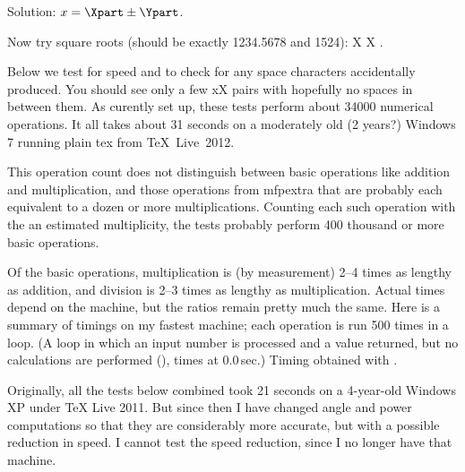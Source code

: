 \indent Solution: $x = \Xpart \pm \I\Ypart$.

Now try square roots (should be exactly 1234.5678 and 1524):
X\startMFPprogram                    %
\Rsqrt\Rpop\X
{}\Rsq\Rsqrt\Rpop\Y
\Export\X
\Export\Y
\stopMFPprogram X \Y.


Below we test for speed and to check for any space characters
accidentally produced. You should see only a few xX pairs with hopefully
no spaces in between them. As curently set up, these tests perform about
34000 numerical operations. It all takes about 31 seconds on a
moderately old (2 years?) Windows 7 running plain tex from
TeX~Live~2012.

This operation count does not distinguish between basic operations like
addition and multiplication, and those operations from mfpextra that are
probably each equivalent to a dozen or more multiplications. Counting
each such operation with the an estimated multiplicity, the tests
probably perform 400 thousand or more basic operations.

Of the basic operations, multiplication is (by measurement) 2--4 times
as lengthy as addition, and division is 2--3 times as lengthy as
multiplication. Actual times depend on the machine, but the ratios
remain pretty much the same. Here is a summary of timings on my fastest
machine; each operation is run 500 times in a loop. (A loop in which
an input number is processed and a value returned, but no calculations are
performed ({\tt\string\MFPzero}), times at $0.0\,$sec.) Timing obtained
with {\tt\string\pdfelapsedtime}.

\medskip

\indent{}

\medskip

Originally, all the tests below combined took 21 seconds on a 4-year-old
Windows XP under TeX Live 2011. But since then I have changed angle and
power computations so that they are considerably more accurate, but with
a possible reduction in speed. I cannot test the speed reduction, since
I no longer have that machine.

